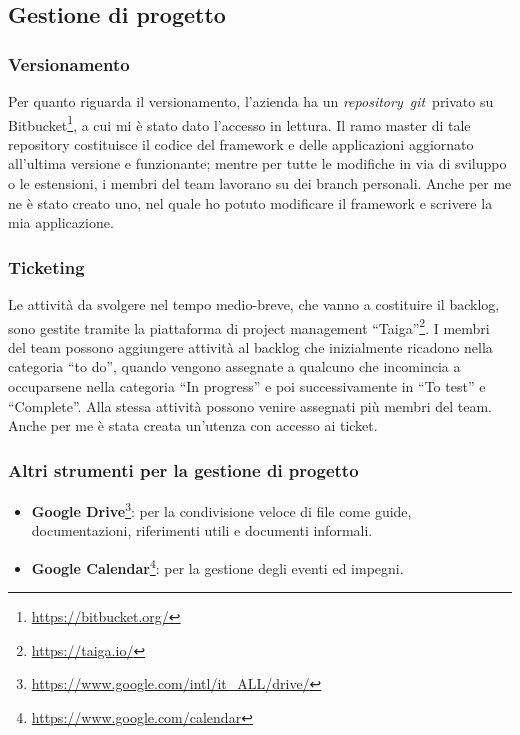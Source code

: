     \subsection{Gestione di progetto}
        \subsubsection{Versionamento}
        Per quanto riguarda il versionamento, l'azienda ha un \emph{\gls{repository}}\glsfirstoccur\ \emph{\gls{git}}\glsfirstoccur\ privato su Bitbucket\footnote{{\color{blue} \url{https://bitbucket.org/}}}, a cui mi è stato dato l'accesso in lettura. Il ramo master di tale repository costituisce il codice del framework e delle applicazioni aggiornato all'ultima versione e funzionante; mentre per tutte le modifiche in via di sviluppo o le estensioni, i membri del team lavorano su dei branch personali. Anche per me ne è stato creato uno, nel quale ho potuto modificare il framework e scrivere la mia applicazione.
        
        \subsubsection{Ticketing}
        Le attività da svolgere nel tempo medio-breve, che vanno a costituire il backlog, sono gestite tramite la piattaforma di project management ``Taiga''\footnote{{\color{blue} \url{https://taiga.io/}}}. I membri del team possono aggiungere attività al backlog che inizialmente ricadono nella categoria ``to do'', quando vengono assegnate a qualcuno che incomincia a occuparsene nella categoria ``In progress'' e poi successivamente in ``To test'' e ``Complete''. Alla stessa attività possono venire assegnati più membri del team.
        Anche per me è stata creata un'utenza con accesso ai ticket.
                
        \subsubsection{Altri strumenti per la gestione di progetto}
        \begin{itemize}
            \item \textbf{Google Drive}\footnote{{\color{blue} \url{https://www.google.com/intl/it\_ALL/drive/}}}: per la condivisione veloce di file come guide, documentazioni, riferimenti utili e documenti informali.
            \item \textbf{Google Calendar}\footnote{{\color{blue} \url{https://www.google.com/calendar}}}: per la gestione degli eventi ed impegni.
        \end{itemize}
    
